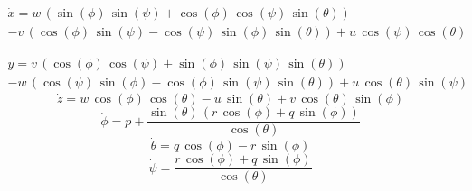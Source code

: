 \documentclass[12pt,a4]{article}
\begin{document}
\begin{multline}
	\dot{x} = w\,\left(\sin\left(\phi \right)\,\sin\left(\psi \right)+\cos\left(\phi \right)\,\cos\left(\psi \right)\,\sin\left(\theta \right)\right)		\\
	-v\,\left(\cos\left(\phi \right)\,\sin\left(\psi \right)-\cos\left(\psi \right)\,\sin\left(\phi \right)\,\sin\left(\theta \right)\right)+u\,\cos\left(\psi \right)\,\cos\left(\theta \right)
\end{multline}

\begin{multline}
	\dot{y} = v\,\left(\cos\left(\phi \right)\,\cos\left(\psi \right)+\sin\left(\phi \right)\,\sin\left(\psi \right)\,\sin\left(\theta \right)\right)		\\
	-w\,\left(\cos\left(\psi \right)\,\sin\left(\phi \right)-\cos\left(\phi \right)\,\sin\left(\psi \right)\,\sin\left(\theta \right)\right)+u\,\cos\left(\theta \right)\,\sin\left(\psi \right)
\end{multline}
\begin{equation*}
	\dot{z} = w\,\cos\left(\phi \right)\,\cos\left(\theta \right)-u\,\sin\left(\theta \right)+v\,\cos\left(\theta \right)\,\sin\left(\phi \right)
\end{equation*}
\begin{equation*}
	\dot{\phi} = p+\frac{\sin\left(\theta \right)\,\left(r\,\cos\left(\phi \right)+q\,\sin\left(\phi \right)\right)}{\cos\left(\theta \right)}
\end{equation*}
\begin{equation*}
	\dot{\theta} = q\,\cos\left(\phi \right)-r\,\sin\left(\phi \right)
\end{equation*}
\begin{equation*}
	\dot{\psi} = \frac{r\,\cos\left(\phi \right)+q\,\sin\left(\phi \right)}{\cos\left(\theta \right)}
\end{equation*}
\end{document}
